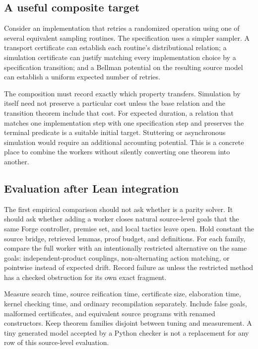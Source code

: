 \subsection{A useful composite target}

Consider an implementation that retries a randomized operation using one of
several equivalent sampling routines. The specification uses a simpler sampler.
A transport certificate can establish each routine's distributional relation;
a simulation certificate can justify matching every implementation choice by
a specification transition; and a Bellman potential on the resulting source
model can establish a uniform expected number of retries.

The composition must record exactly which property transfers. Simulation by
itself need not preserve a particular cost unless the base relation and the
transition theorem include that cost. For expected duration, a relation that
matches one implementation step with one specification step and preserves the
terminal predicate is a suitable initial target. Stuttering or asynchronous
simulation would require an additional accounting potential. This is a concrete
place to combine the workers without silently converting one theorem into
another.

\subsection{Evaluation after Lean integration}

The first empirical comparison should not ask whether \grind{} is a parity
solver. It should ask whether adding a worker closes natural source-level goals
that the same Forge controller, premise set, and local tactics leave open.
Hold constant the source bridge, retrieved lemmas, proof budget, and definitions.
For each family, compare the full worker with an intentionally restricted
alternative on the same goals: independent-product couplings, non-alternating
action matching, or pointwise instead of expected drift. Record failure as
 unless the restricted method has a checked obstruction for
its own exact fragment.

Measure search time, source reification time, certificate size, elaboration
time, kernel checking time, and ordinary recompilation separately. Include
false goals, malformed certificates, and equivalent source programs with
renamed constructors. Keep theorem families disjoint between tuning and
measurement. A tiny generated model accepted by a Python checker is not a
replacement for any row of this source-level evaluation.

